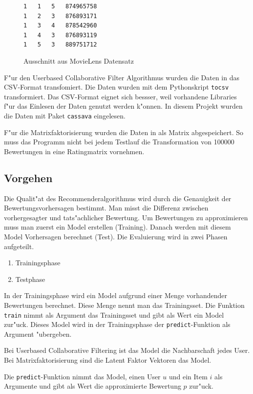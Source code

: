 \documentclass[a4paper, 12pt]{article}
\begin{document}
\begin{figure}
\centering
\begin{verbatim}
1	1	5	874965758
1	2	3	876893171
1	3	4	878542960
1	4	3	876893119
1	5	3	889751712
\end{verbatim}
\caption{Ausschnitt aus MovieLens Datensatz}
\label{fig:movielens}
\end{figure}

F"ur den Userbased Collaborative Filter Algorithmus wurden die Daten in das CSV-Format transfomiert. Die Daten wurden mit dem Pythonskript \verb|tocsv| transformiert. Das CSV-Format eignet sich bessser, weil vorhandene Libraries f"ur das Einlesen der Daten genutzt werden k"onnen. In diesem Projekt wurden die Daten mit Paket \verb|cassava| eingelesen.

F"ur die Matrixfaktorisierung wurden die Daten in als Matrix abgespeichert. So muss das Programm nicht bei jedem Testlauf die Transformation von 100000 Bewertungen in eine Ratingmatrix vornehmen.

\subsection{Vorgehen}
\label{sec:procedure}

Die Qualit"at des Recommenderalgorithmus wird durch die Genauigkeit der Bewertungsvorhersagen bestimmt. Man misst die Differenz zwischen vorhergesagter und tats"achlicher Bewertung. 
Um Bewertungen zu approximieren muss man zuerst ein Model erstellen (Training). Danach werden mit diesem Model Vorhersagen berechnet (Test). Die Evaluierung wird in zwei Phasen aufgeteilt. 

\begin{enumerate}
\item Trainingsphase
\item Testphase
\end{enumerate}

In der Trainingsphase wird ein Model aufgrund einer Menge vorhandender Bewertungen berechnet. Diese Menge nennt man das Trainingsset. Die Funktion \verb|train| nimmt als Argument das Trainingsset und gibt als Wert ein Model zur"uck. Dieses Model wird in der Trainingsphase der \verb|predict|-Funktion als Argument "ubergeben. 

Bei Userbased Collaborative Filtering ist das Model die Nachbarschaft jedes User. Bei Matrixfaktorisierung sind die Latent Faktor Vektoren das Model.

Die \verb|predict|-Funktion nimmt das Model, einen User $u$ und ein Item $i$ als Argumente und gibt als Wert die approximierte Bewertung $p$ zur"uck.
\end{document}
